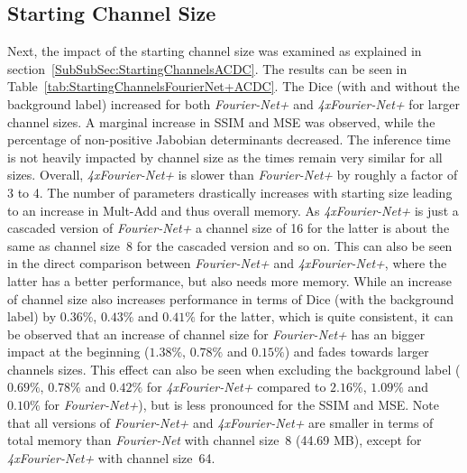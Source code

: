 \subsection{Starting Channel Size} \label{SubSec:ResultsStartingChannelsACDC}
Next, the impact of the starting channel size was examined as explained in section~\ref{SubSubSec:StartingChannelsACDC}. The results can be seen in Table~\ref{tab:StartingChannelsFourierNet+ACDC}. The Dice (with and without the background label) increased for both \emph{Fourier-Net+} and \emph{4xFourier-Net+} for larger channel sizes. A marginal increase in SSIM and MSE was observed, while the percentage of non-positive Jabobian determinants decreased. The inference time is not heavily impacted by channel size as the times remain very similar for all sizes. Overall, \emph{4xFourier-Net+} is slower than \emph{Fourier-Net+} by roughly a factor of 3 to 4. The number of parameters drastically increases with starting size leading to an increase in Mult-Add and thus overall memory. As \emph{4xFourier-Net+} is just a cascaded version of \emph{Fourier-Net+} a channel size of 16 for the latter is about the same as channel size~8 for the cascaded version and so on. This can also be seen in the direct comparison between \emph{Fourier-Net+} and \emph{4xFourier-Net+}, where the latter has a better performance, but also needs more memory. While an increase of channel size also increases performance in terms of Dice (with the background label) by $0.36\%$, $0.43\%$ and $0.41\%$ for the latter, which is quite consistent, it can be observed that an increase of channel size for \emph{Fourier-Net+} has an bigger impact at the beginning ($1.38\%$, $0.78\%$ and $0.15\%$) and fades towards larger channels sizes. This effect can also be seen when excluding the background label ($0.69\%$, $0.78\%$ and $0.42\%$ for \emph{4xFourier-Net+} compared to $2.16\%$, $1.09\%$ and $0.10\%$ for \emph{Fourier-Net+}), but is less pronounced for the SSIM and MSE. Note that all versions of \emph{Fourier-Net+} and \emph{4xFourier-Net+} are smaller in terms of total memory than \emph{Fourier-Net} with channel size~8 (44.69 MB), except for \emph{4xFourier-Net+} with channel size~64.

